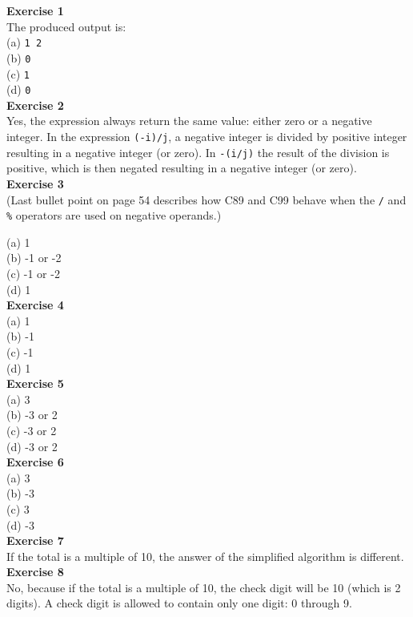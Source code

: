 \documentclass[a4paper, 10pt]{article}
\begin{document}
\textbf{Exercise 1} \\
The produced output is: \\
(a) \texttt{1 2} \\ 
(b) \texttt{0} \\
(c) \texttt{1} \\
(d) \texttt{0} \\

\textbf{Exercise 2} \\
Yes, the expression always return the same value: either zero or a negative integer. In the expression \texttt{(-i)/j}, a negative integer is divided by positive integer resulting in a negative integer (or zero). In \texttt{-(i/j)} the result of the division is positive, which is then negated resulting in a negative integer (or zero). \\

\textbf{Exercise 3} \\
(Last bullet point on page 54 describes how C89 and C99 behave when the \texttt{/} and \texttt{\%} operators are used on negative operands.) 

(a) 1 \\
(b) -1 or -2 \\
(c) -1 or -2 \\
(d) 1 \\

\textbf{Exercise 4} \\
(a) 1 \\
(b) -1 \\
(c) -1 \\
(d) 1 \\

\textbf{Exercise 5} \\
(a) 3 \\
(b) -3 or 2 \\
(c) -3 or 2 \\
(d) -3 or 2 \\

\textbf{Exercise 6} \\
(a) 3 \\
(b) -3 \\
(c) 3 \\
(d) -3 \\

\textbf{Exercise 7} \\
If the total is a multiple of 10, the answer of the simplified algorithm is different. \\

\textbf{Exercise 8} \\
No, because if the total is a multiple of 10, the check digit will be 10 (which is 2 digits). A check digit is allowed to contain only one digit: 0 through 9.\\
\end{document}
